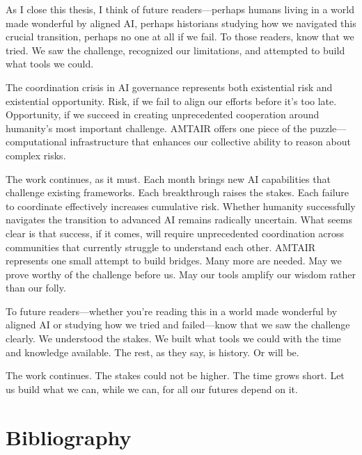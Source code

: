 \documentclass[
  11pt,
  letterpaper,
  openany]{book}
\let\cleardoublepage\clearpage
\begin{document}
As I close this thesis, I think of future readers---perhaps humans
living in a world made wonderful by aligned AI, perhaps historians
studying how we navigated this crucial transition, perhaps no one at all
if we fail. To those readers, know that we tried. We saw the challenge,
recognized our limitations, and attempted to build what tools we could.

The coordination crisis in AI governance represents both existential
risk and existential opportunity. Risk, if we fail to align our efforts
before it's too late. Opportunity, if we succeed in creating
unprecedented cooperation around humanity's most important challenge.
AMTAIR offers one piece of the puzzle---computational infrastructure
that enhances our collective ability to reason about complex risks.

The work continues, as it must. Each month brings new AI capabilities
that challenge existing frameworks. Each breakthrough raises the stakes.
Each failure to coordinate effectively increases cumulative risk.
Whether humanity successfully navigates the transition to advanced AI
remains radically uncertain. What seems clear is that success, if it
comes, will require unprecedented coordination across communities that
currently struggle to understand each other. AMTAIR represents one small
attempt to build bridges. Many more are needed. May we prove worthy of
the challenge before us. May our tools amplify our wisdom rather than
our folly.

To future readers---whether you're reading this in a world made
wonderful by aligned AI or studying how we tried and failed---know that
we saw the challenge clearly. We understood the stakes. We built what
tools we could with the time and knowledge available. The rest, as they
say, is history. Or will be.

The work continues. The stakes could not be higher. The time grows
short. Let us build what we can, while we can, for all our futures
depend on it.


\chapter*{Bibliography}\label{bibliography}


\printbibliography[heading=none]

\cleardoublepage
{}
{}
\appendix
\end{document}
